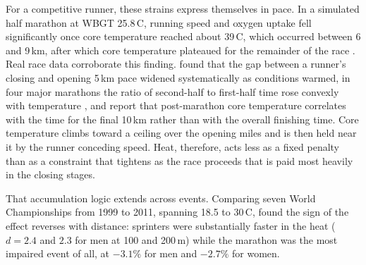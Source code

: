 \documentclass[11pt]{article}
\renewcommand{\_}{\textunderscore\allowbreak}
\begin{document}
For a competitive runner, these strains express themselves in pace. In a simulated half marathon at WBGT 25.8\,\textdegree C, running speed and oxygen uptake fell significantly once core temperature reached about 39\,\textdegree C, which occurred between 6 and 9\,km, after which core temperature plateaued for the remainder of the race \citep{rodrigues2020}. Real race data corroborate this finding. \citet{ely2008} found that the gap between a runner's closing and opening 5\,km pace widened systematically as conditions warmed, in four major marathons the ratio of second-half to first-half time rose convexly with temperature \citep{oliveira2026}, and \citet{maughan2007} report that post-marathon core temperature correlates with the time for the final 10\,km rather than with the overall finishing time. Core temperature climbs toward a ceiling over the opening miles and is then held near it by the runner conceding speed. Heat, therefore, acts less as a fixed penalty than as a constraint that tightens as the race proceeds that is paid most heavily in the closing stages. 

That accumulation logic extends across events. Comparing seven World Championships from 1999 to 2011, spanning 18.5 to 30\,\textdegree C, \citet{guy2014} found the sign of the effect reverses with distance: sprinters were substantially faster in the heat ($d = 2.4$ and $2.3$ for men at 100 and 200\,m) while the marathon was the most impaired event of all, at $-3.1\%$ for men and $-2.7\%$ for women.
\end{document}
